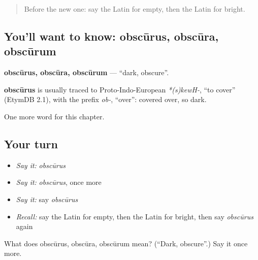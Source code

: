 \label{lesson:LA-C96-obscurus}



\begin{quote}
Before the new one: say the Latin for empty, then the Latin for bright.
\end{quote}

\subsection*{You'll want to know: obscūrus, obscūra, obscūrum}
\textbf{obscūrus, obscūra, obscūrum} — \textquotedblleft{}dark, obscure\textquotedblright{}.

\begin{cousinweb}
\textbf{obscūrus} is usually traced to Proto-Indo-European \emph{*(s)kewH-}, \textquotedblleft{}to cover\textquotedblright{} (EtymDB 2.1), with the prefix \emph{ob-}, \textquotedblleft{}over\textquotedblright{}: covered over, so dark.
\end{cousinweb}

\begin{grammarlens}[title={What you've built}]
One more word for this chapter.
\end{grammarlens}

\subsection*{Your turn}
\begin{itemize}
\raggedright
  \item \emph{Say it:} \emph{obscūrus}
  \item \emph{Say it:} \emph{obscūrus}, once more
  \item \emph{Say it:} say \emph{obscūrus}
  \item \emph{Recall:} say the Latin for empty, then the Latin for bright, then say \emph{obscūrus} again
\end{itemize}

\begin{tcolorbox}[breakable,colback=teal!4,colframe=teal!35!black,title={Before you move on}]
What does obscūrus, obscūra, obscūrum mean? (\textquotedblleft{}Dark, obscure\textquotedblright{}.) Say it once more.
\end{tcolorbox}

